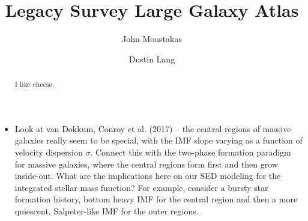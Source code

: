 \documentclass[preprint]{aastex61}
\begin{document}
\title{Legacy Survey Large Galaxy Atlas}

\author{John Moustakas}

\author{Dustin Lang} 

\begin{abstract}
I like cheese.
\end{abstract}









\begin{itemize}

\item{Look at van Dokkum, Conroy et al. (2017) -- the central regions of massive
  galaxies really seem to be special, with the IMF slope varying as a function
  of velocity dispersion $\sigma$.  Connect this with the two-phase formation
  paradigm for massive galaxies, where the central regions form first and then
  grow inside-out.  What are the implications here on our SED modeling for the
  integrated stellar mass function?  For example, consider a bursty star
  formation history, bottom heavy IMF for the central region and then a more
  quiescent, Salpeter-like IMF for the outer regions.}

\end{itemize}




%
%
%
\end{document}

